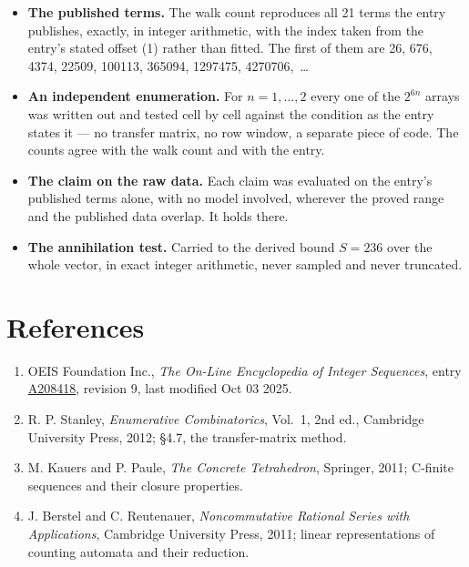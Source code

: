 \documentclass[11pt]{article}
\theoremstyle{definition}
\begin{document}
\begin{itemize}

\item {\bfseries The published terms.} The walk count reproduces all 21 terms the entry publishes, exactly, in integer arithmetic, with the index taken from the entry's stated offset (1) rather than fitted. The first of them are 26, 676, 4374, 22509, 100113, 365094, 1297475, 4270706,~\dots

\item {\bfseries An independent enumeration.} For $n = 1,\dots,2$ every one of the $2^{6n}$ arrays was written out and tested cell by cell against the condition as the entry states it --- no transfer matrix, no row window, a separate piece of code. The counts agree with the walk count and with the entry.

\item {\bfseries The claim on the raw data.} Each claim was evaluated on the entry's published terms alone, with no model involved, wherever the proved range and the published data overlap. It holds there.

\item {\bfseries The annihilation test.} Carried to the derived bound $S = 236$ over the whole vector, in exact integer arithmetic, never sampled and never truncated.

\end{itemize}

\section{References}

\begin{enumerate}

\item OEIS Foundation Inc., \emph{The On-Line Encyclopedia of Integer Sequences}, entry \href{https://oeis.org/A208418}{A208418}, revision 9, last modified Oct 03 2025.

\item R. P. Stanley, \emph{Enumerative Combinatorics}, Vol.~1, 2nd ed., Cambridge University Press, 2012; \S4.7, the transfer-matrix method.

\item M. Kauers and P. Paule, \emph{The Concrete Tetrahedron}, Springer, 2011; C-finite sequences and their closure properties.

\item J. Berstel and C. Reutenauer, \emph{Noncommutative Rational Series with Applications}, Cambridge University Press, 2011; linear representations of counting automata and their reduction.

\end{enumerate}
\end{document}
